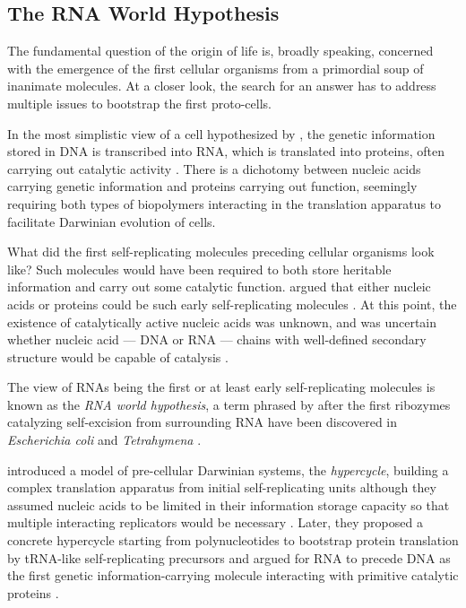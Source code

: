 \documentclass[../../master.tex]{subfiles}
\begin{document}
\subsection{The RNA World Hypothesis}
\label{sub:intro:rnaworld}


The fundamental question of the origin of life is, broadly speaking, concerned with the emergence of the first cellular organisms from a primordial soup of inanimate molecules.
At a closer look, the search for an answer has to address multiple issues to bootstrap the first proto-cells.

In the most simplistic view of a cell hypothesized by \citeauthor{crick_protein_1958}, the genetic information stored in DNA is transcribed into RNA, which is translated into proteins, often carrying out catalytic activity \parencite{crick_protein_1958}.
There is a dichotomy between nucleic acids carrying genetic information and proteins carrying out function, seemingly requiring both types of biopolymers interacting in the translation apparatus to facilitate Darwinian evolution of cells.

What did the first self-replicating molecules preceding cellular organisms look like?
Such molecules would have been required to both store heritable information and carry out some catalytic function.
\citeauthor{orgel_evolution_1968} argued that either nucleic acids or proteins could be such early self-replicating molecules \parencite{orgel_evolution_1968}.
At this point, the existence of catalytically active nucleic acids was unknown, and \citeauthor{orgel_evolution_1968} was uncertain whether nucleic acid --- DNA or RNA --- chains with well-defined secondary structure would be capable of catalysis \parencite{orgel_evolution_1968}.

The view of RNAs being the first or at least early self-replicating molecules is known as the \emph{RNA world hypothesis}, a term phrased by \citeauthor{gilbert_origin_1986} after the first ribozymes catalyzing self-excision from surrounding RNA have been discovered in \textit{Escherichia coli} and \textit{Tetrahymena} \parencite{gilbert_origin_1986}.

\citeauthor{eigen_principle_1977} introduced a model of pre-cellular Darwinian systems, the \emph{hypercycle}, building a complex translation apparatus from initial self-replicating units although they assumed nucleic acids to be limited in their information storage capacity so that multiple interacting replicators would be necessary \parencite{eigen_principle_1977}.
Later, they proposed a concrete hypercycle starting from polynucleotides to bootstrap protein translation by tRNA-like self-replicating precursors and argued for RNA to precede DNA as the first genetic information-carrying molecule interacting with primitive catalytic proteins \parencite{eigen_hypercycle_1978-1, eigen_origin_1981}.
\end{document}
